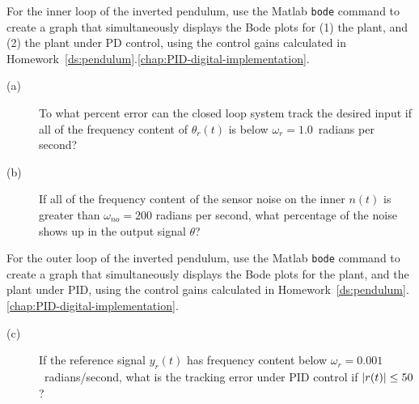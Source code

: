 
For the inner loop of the inverted pendulum, use the Matlab \texttt{bode} command to create a graph that simultaneously displays the Bode plots for (1) the plant, and (2) the plant under PD control, using the control gains calculated in Homework~\ref{ds:pendulum}.\ref{chap:PID-digital-implementation}.  
\begin{description}
\item[(a)]  To what percent error can the closed loop system track the desired input if all of the frequency content of $\theta_r(t)$ is below $\omega_r = 1.0$~radians per second?
\item[(b)] If all of the frequency content of the sensor noise on the inner $n(t)$ is greater than $\omega_{no} = 200$ radians per second, what percentage of the noise shows up in the output signal $\theta$?
\end{description}

For the outer loop of the inverted pendulum, use the Matlab \texttt{bode} command to create a graph that simultaneously displays the Bode plots for the plant, and the plant under PID, using the control gains calculated in Homework~\ref{ds:pendulum}.\ref{chap:PID-digital-implementation}.  
\begin{description}
\item[(c)] If the reference signal $y_r(t)$ has frequency content below $\omega_r=0.001$~radians/second, what is the tracking error under PID control if $\left|r(t)\right|\leq 50$?
\end{description}
